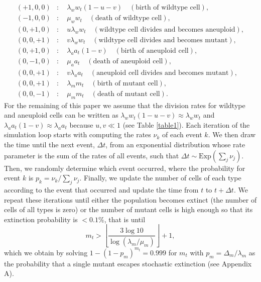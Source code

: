 \documentclass[12pt]{extarticle}
\begin{document}
\begin{subequations}
\begin{flalign*}
(+1,0,0)&:\quad \lambda_ww_t\left(1-u-v\right)\quad\left(\text{birth of wildtype cell}\right),\\
(-1,0,0)&:\quad \mu_ww_t\quad\left(\text{death of wildtype cell}\right),\\
(0,+1,0)&:\quad u\lambda_ww_t\quad\left(\text{wildtype cell divides and becomes aneuploid}\right),\\
(0,0,+1)&:\quad v\lambda_ww_t\quad\left(\text{wildtype cell divides and becomes mutant}\right),\\
(0,+1,0)&:\quad \lambda_aa_t\left(1-v\right)\quad\left(\text{birth of aneuploid cell}\right),\\
(0,-1,0)&:\quad \mu_aa_t\quad\left(\text{death of aneuploid cell}\right),\\
(0,0,+1)&:\quad v\lambda_aa_t\quad\left(\text{aneuploid cell divides and becomes mutant}\right),\\
(0,0,+1)&:\quad \lambda_mm_t\quad\left(\text{birth of mutant cell}\right),\\
(0,0,-1)&:\quad \mu_mm_t\quad\left(\text{death of mutant cell}\right).
\end{flalign*}
\end{subequations}
For the remaining of this paper we assume that the division rates for wildtype and aneuploid cells can be written as $\lambda_ww_t\left(1-u-v\right)\approx \lambda_ww_t$ and $\lambda_aa_t\left(1-v\right)\approx\lambda_aa_t$ because $u,v\ll1$ (see Table \ref{table1}).
Each iteration of the simulation loop starts with computing the rates $\nu_k$ of each event $k$.
We then draw the time until the next event, $\Delta t$, from an exponential distribution whose rate parameter is the sum of the rates of all events, such that $\Delta t \sim \text{Exp}(\sum_j \nu_j)$.
Then, we randomly determine which event occurred, where the probability for event $k$ is $p_k = \nu_k/\sum_j \nu_j$.
Finally, we update the number of cells of each type according to the event that occurred and update the time from $t$ to $t+\Delta t$.
We repeat these iterations until either the population becomes extinct (the number of cells of all types is zero) or the number of mutant cells is high enough so that its extinction probability is $<0.1\%$, that is until
\begin{equation*}
m_t > \left\lfloor\frac{3\log{10}}{\log{\left(\lambda_m / \mu_m\right)}}\right\rfloor + 1 ,
\end{equation*}
which we obtain by solving $1-(1-p_m)^{m_t}=0.999$ for $m_t$ with $p_m=\Delta_m/\lambda_m$ as the probability that a single mutant escapes stochastic extinction  (see Appendix A).
\end{document}
